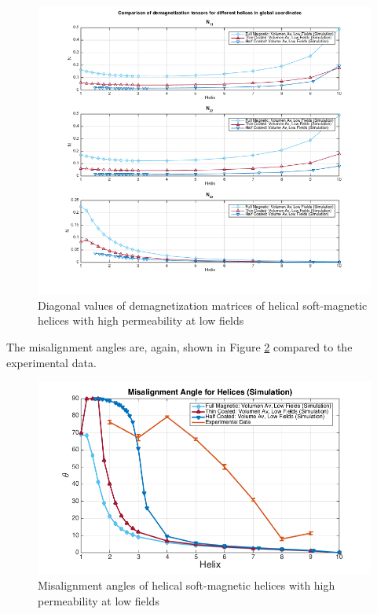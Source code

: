 \begin{figure}[ht]
	\centering
  \includegraphics[width=1\textwidth]{Pictures/DemagFactors_Comparison_Low.png}
	\caption{Diagonal values of demagnetization matrices of helical soft-magnetic helices with high permeability at low fields}
	\label{fig:DemagLow}
\end{figure}

The misalignment angles are, again, shown in Figure \ref{fig:MisalignmentAngles_Low} compared to the experimental data.

\begin{figure}[ht]
	\centering
  \includegraphics[width=1\textwidth]{Pictures/MisalignmentAngles_Low.png}
	\caption{Misalignment angles of helical soft-magnetic helices with high permeability at low fields}
	\label{fig:MisalignmentAngles_Low}
\end{figure}

